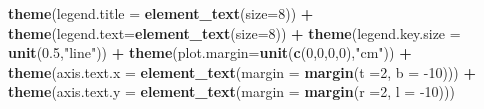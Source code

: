 \documentclass[12pt,oneside]{reedthesis}
\newenvironment{Shaded}{\begin{snugshade}}{\end{snugshade}}
\newcommand{\DataTypeTok}[1]{\textcolor[rgb]{0.13,0.29,0.53}{#1}}
\newcommand{\DecValTok}[1]{\textcolor[rgb]{0.00,0.00,0.81}{#1}}
\newcommand{\FloatTok}[1]{\textcolor[rgb]{0.00,0.00,0.81}{#1}}
\newcommand{\KeywordTok}[1]{\textcolor[rgb]{0.13,0.29,0.53}{\textbf{#1}}}
\newcommand{\NormalTok}[1]{#1}
\newcommand{\OperatorTok}[1]{\textcolor[rgb]{0.81,0.36,0.00}{\textbf{#1}}}
\newcommand{\StringTok}[1]{\textcolor[rgb]{0.31,0.60,0.02}{#1}}
\begin{document}
\begin{Shaded}
\begin{Highlighting}[]
\StringTok{  }\KeywordTok{theme}\NormalTok{(}\DataTypeTok{legend.title =} \KeywordTok{element_text}\NormalTok{(}\DataTypeTok{size=}\DecValTok{8}\NormalTok{)) }\OperatorTok{+}
\StringTok{  }\KeywordTok{theme}\NormalTok{(}\DataTypeTok{legend.text=}\KeywordTok{element_text}\NormalTok{(}\DataTypeTok{size=}\DecValTok{8}\NormalTok{)) }\OperatorTok{+}
\StringTok{  }\KeywordTok{theme}\NormalTok{(}\DataTypeTok{legend.key.size =} \KeywordTok{unit}\NormalTok{(}\FloatTok{0.5}\NormalTok{,}\StringTok{"line"}\NormalTok{)) }\OperatorTok{+}
\StringTok{  }\KeywordTok{theme}\NormalTok{(}\DataTypeTok{plot.margin=}\KeywordTok{unit}\NormalTok{(}\KeywordTok{c}\NormalTok{(}\DecValTok{0}\NormalTok{,}\DecValTok{0}\NormalTok{,}\DecValTok{0}\NormalTok{,}\DecValTok{0}\NormalTok{),}\StringTok{"cm"}\NormalTok{)) }\OperatorTok{+}
\StringTok{  }\KeywordTok{theme}\NormalTok{(}\DataTypeTok{axis.text.x =} \KeywordTok{element_text}\NormalTok{(}\DataTypeTok{margin =}  \KeywordTok{margin}\NormalTok{(}\DataTypeTok{t =}\DecValTok{2}\NormalTok{, }\DataTypeTok{b =} \DecValTok{-10}\NormalTok{))) }\OperatorTok{+}\StringTok{ }
\StringTok{  }\KeywordTok{theme}\NormalTok{(}\DataTypeTok{axis.text.y =} \KeywordTok{element_text}\NormalTok{(}\DataTypeTok{margin =}  \KeywordTok{margin}\NormalTok{(}\DataTypeTok{r =}\DecValTok{2}\NormalTok{, }\DataTypeTok{l =} \DecValTok{-10}\NormalTok{)))}
  

\end{Highlighting}
\end{Shaded}
\end{document}
